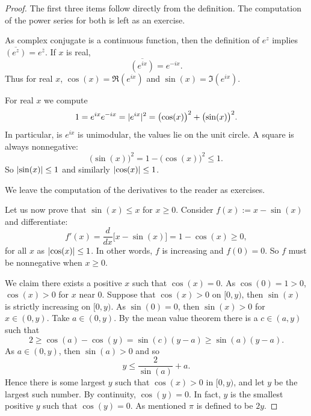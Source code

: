 \begin{proof}
The first three items follow directly from the definition.
The computation of the power series for both is left as an exercise.

As complex conjugate is a continuous function, then the definition
of $e^z$ implies
$\overline{(e^z)} = e^{\bar{z}}$.  If
$x$ is real,
\begin{equation*}
\overline{(e^{ix})} = e^{-ix} .
\end{equation*}
Thus for real $x$,
$\cos(x) = \Re (e^{ix})$ and $\sin(x) = \Im (e^{ix})$.

For real $x$ we compute
\begin{equation*}
1 =  e^{ix} e^{-ix} = \lvert {e^{ix}} \rvert^2 = {\bigl( \cos(x) \bigr)}^2 + {\bigl( \sin(x) \bigr)}^2 .
\end{equation*}
In particular, is $e^{ix}$ is unimodular, the values lie on the unit circle.
A square is always nonnegative:
\begin{equation*}
{\bigl(\sin(x)\bigr)}^2 = 1-{\bigl(\cos(x)\bigr)}^2 \leq 1 .
\end{equation*}
So $\lvert {\sin(x)} \rvert \leq 1$ and similarly 
$\lvert {\cos(x)} \rvert \leq 1$.

We leave the computation of the derivatives to the reader as exercises.

Let us now prove that $\sin(x) \leq x$ for $x \geq 0$.
Consider
$f(x) := x-\sin(x)$ and differentiate:
\begin{equation*}
f'(x) = \frac{d}{dx} \bigl[ x - \sin(x) \bigr]
=
1 -\cos(x) \geq 0 ,
\end{equation*}
for all $x$ as $\lvert {\cos(x)} \rvert \leq 1$.
In other words, $f$ is increasing and $f(0) = 0$.
So $f$ must be nonnegative when $x \geq 0$.

We claim there exists a positive $x$ such that $\cos(x) = 0$.
As $\cos(0) = 1 > 0$, $\cos(x) > 0$
for $x$ near 0.
Suppose that $\cos(x) > 0$ on $[0,y)$, then $\sin(x)$ is strictly
increasing on $[0,y)$.  As $\sin(0) = 0$, then
$\sin(x) > 0$ for $x \in (0,y)$.  Take $a \in (0,y)$.  By
the mean value theorem there is a $c \in (a,y)$ such that
\begin{equation*}
2 \geq \cos(a)-\cos(y) = \sin(c)(y-a) \geq \sin(a)(y-a) .
\end{equation*}
As $a \in (0,y)$, then $\sin(a) > 0$ and so
\begin{equation*}
y \leq \frac{2}{\sin(a)} + a .
\end{equation*}
Hence there is some largest $y$ such that $\cos(x) > 0$ in $[0,y)$,
and let $y$ be the largest such number.
By continuity, $\cos(y) = 0$.
In fact, $y$ is the
smallest positive $y$ such that $\cos(y) = 0$.  As mentioned
$\pi$ is defined to be $2y$.


\end{proof}
